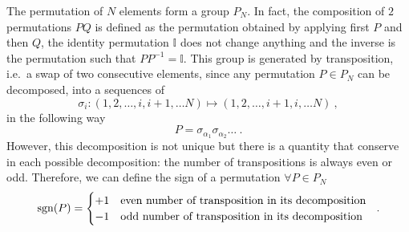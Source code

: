     The permutation of $N$ elements form a group $P_N$. In fact, the composition of $2$ permutations $PQ$ is defined as the permutation obtained by applying first $P$ and then $Q$, the identity permutation $\mathbb I$ does not change anything and the inverse is the permutation such that $P P^{-1} = \mathbb I$. This group is generated by transposition, i.e.~a swap of two consecutive elements, since any permutation $P \in P_N$ can be decomposed, into a sequences of 
    \begin{equation*}
        \sigma_i \colon (1,2,\ldots, i, i+1, \ldots N) \mapsto (1,2,\ldots, i+1, i, \ldots N) ~,
    \end{equation*}
    in the following way 
    \begin{equation}\label{per:dec}
        P = \sigma_{\alpha_1} \sigma_{\alpha_2} \ldots ~.
    \end{equation}
    However, this decomposition is not unique but there is a quantity that conserve in each possible decomposition: the number of transpositions is always even or odd. Therefore, we can define the sign of a permutation $\forall P \in P_N$
    \begin{equation*}
        \operatorname{sgn}(P) = \begin{cases}
            + 1 & \textnormal{even number of transposition in its decomposition } \\
            - 1 & \textnormal{odd number of transposition in its decomposition } \\
        \end{cases} ~.
    \end{equation*}

